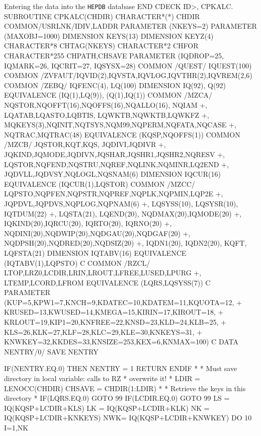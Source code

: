 \begin{XMPt}{Entering the data into the {\tt HEPDB} database}
      END
CDECK  ID>, CPKALC.
      SUBROUTINE CPKALC(CHDIR)
      CHARACTER*(*) CHDIR
      COMMON/USRLNK/IDIV,LADDR
      PARAMETER    (NKEYS=2)
      PARAMETER    (MAXOBJ=1000)
      DIMENSION     KEYS(13)
      DIMENSION     KEYZ(4)
      CHARACTER*8   CHTAG(NKEYS)
      CHARACTER*2   CHFOR
      CHARACTER*255 CHPATH,CHSAVE
      PARAMETER      (IQDROP=25, IQMARK=26, IQCRIT=27, IQSYSX=28)
      COMMON /QUEST/ IQUEST(100)
      COMMON /ZVFAUT/IQVID(2),IQVSTA,IQVLOG,IQVTHR(2),IQVREM(2,6)
      COMMON /ZEBQ/  IQFENC(4), LQ(100)
                              DIMENSION    IQ(92),        Q(92)
                              EQUIVALENCE (IQ(1),LQ(9)), (Q(1),IQ(1))
      COMMON /MZCA/  NQSTOR,NQOFFT(16),NQOFFS(16),NQALLO(16), NQIAM
     +,              LQATAB,LQASTO,LQBTIS, LQWKTB,NQWKTB,LQWKFZ
     +,              MQKEYS(3),NQINIT,NQTSYS,NQM99,NQPERM,NQFATA,NQCASE
     +,              NQTRAC,MQTRAC(48)
                                       EQUIVALENCE (KQSP,NQOFFS(1))
      COMMON /MZCB/  JQSTOR,KQT,KQS,  JQDIVI,JQDIVR
     +,              JQKIND,JQMODE,JQDIVN,JQSHAR,JQSHR1,JQSHR2,NQRESV
     +,              LQSTOR,NQFEND,NQSTRU,NQREF,NQLINK,NQMINR,LQ2END
     +,              JQDVLL,JQDVSY,NQLOGL,NQSNAM(6)
                                       DIMENSION    IQCUR(16)
                                       EQUIVALENCE (IQCUR(1),LQSTOR)
      COMMON /MZCC/  LQPSTO,NQPFEN,NQPSTR,NQPREF,NQPLK,NQPMIN,LQP2E
     +,              JQPDVL,JQPDVS,NQPLOG,NQPNAM(6)
     +,              LQSYSS(10), LQSYSR(10), IQTDUM(22)
     +,              LQSTA(21), LQEND(20), NQDMAX(20),IQMODE(20)
     +,              IQKIND(20),IQRCU(20), IQRTO(20), IQRNO(20)
     +,              NQDINI(20),NQDWIP(20),NQDGAU(20),NQDGAF(20)
     +,              NQDPSH(20),NQDRED(20),NQDSIZ(20)
     +,              IQDN1(20), IQDN2(20),      KQFT, LQFSTA(21)
                                       DIMENSION    IQTABV(16)
                                       EQUIVALENCE (IQTABV(1),LQPSTO)
C
      COMMON /RZCL/  LTOP,LRZ0,LCDIR,LRIN,LROUT,LFREE,LUSED,LPURG
     +,              LTEMP,LCORD,LFROM
                   EQUIVALENCE (LQRS,LQSYSS(7))
C
      PARAMETER (KUP=5,KPW1=7,KNCH=9,KDATEC=10,KDATEM=11,KQUOTA=12,
     +           KRUSED=13,KWUSED=14,KMEGA=15,KIRIN=17,KIROUT=18,
     +           KRLOUT=19,KIP1=20,KNFREE=22,KNSD=23,KLD=24,KLB=25,
     +           KLS=26,KLK=27,KLF=28,KLC=29,KLE=30,KNKEYS=31,
     +           KNWKEY=32,KKDES=33,KNSIZE=253,KEX=6,KNMAX=100)
C
      DATA          NENTRY/0/
      SAVE          NENTRY

      IF(NENTRY.EQ.0) THEN
         NENTRY = 1
         RETURN
      ENDIF
*
*     Must save directory in local variable: calls to RZ
*     overwrite it!
*
      LDIR   = LENOCC(CHDIR)
      CHSAVE = CHDIR(1:LDIR)
*
*     Retrieve the keys in this directory
*
      IF(LQRS.EQ.0)  GOTO 99
      IF(LCDIR.EQ.0) GOTO 99
      LS = IQ(KQSP+LCDIR+KLS)
      LK = IQ(KQSP+LCDIR+KLK)
      NK = IQ(KQSP+LCDIR+KNKEYS)
      NWK= IQ(KQSP+LCDIR+KNWKEY)
      DO 10 I=1,NK


\end{XMPt}

